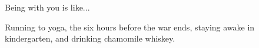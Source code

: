 Being with you is like...

Running to yoga,
the six hours before the war ends,
staying awake in kindergarten,
and drinking chamomile whiskey.

